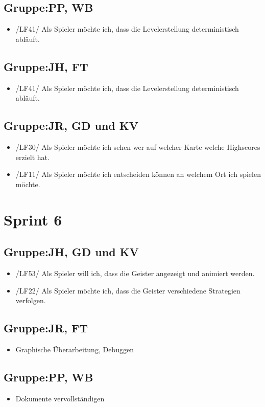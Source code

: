 \documentclass[11pt,a4paper]{article}
\begin{document}
\subsection*{Gruppe:PP, WB}
\begin{itemize}
\item /LF41/ Als Spieler möchte ich, dass die Levelerstellung deterministisch abläuft.
\end{itemize}

\subsection*{Gruppe:JH, FT}
\begin{itemize}
\item /LF41/ Als Spieler möchte ich, dass die Levelerstellung deterministisch abläuft.
\end{itemize}

\subsection*{Gruppe:JR, GD und KV}
\begin{itemize}
\item /LF30/ Als Spieler möchte ich sehen wer auf welcher Karte welche Highscores
erzielt hat.
\item /LF11/ Als Spieler möchte ich entscheiden können an welchem Ort ich spielen möchte.
\end{itemize}


\section*{Sprint 6}

\subsection*{Gruppe:JH, GD und KV}
\begin{itemize}
\item /LF53/ Als Spieler will ich, dass die Geister angezeigt und animiert werden. 
\item /LF22/ Als Spieler möchte ich, dass die Geister verschiedene Strategien verfolgen.
\end{itemize}

\subsection*{Gruppe:JR, FT}
\begin{itemize}
\item Graphische Überarbeitung, Debuggen
\end{itemize}

\subsection*{Gruppe:PP, WB}
\begin{itemize}
\item Dokumente vervollständigen
\end{itemize}
\end{document}
